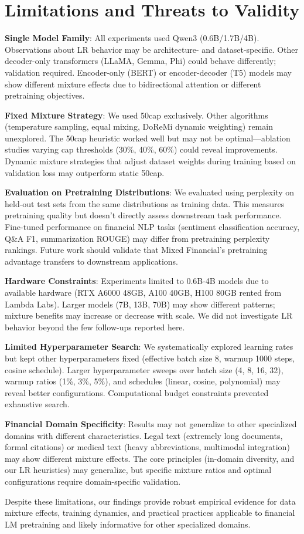 \section{Limitations and Threats to Validity}

\textbf{Single Model Family}: All experiments used Qwen3 (0.6B/1.7B/4B). Observations about LR behavior may be architecture- and dataset-specific. Other decoder-only transformers (LLaMA, Gemma, Phi) could behave differently; validation required. Encoder-only (BERT) or encoder-decoder (T5) models may show different mixture effects due to bidirectional attention or different pretraining objectives.

\textbf{Fixed Mixture Strategy}: We used 50cap exclusively. Other algorithms (temperature sampling, equal mixing, DoReMi dynamic weighting) remain unexplored. The 50cap heuristic worked well but may not be optimal—ablation studies varying cap thresholds (30\%, 40\%, 60\%) could reveal improvements. Dynamic mixture strategies that adjust dataset weights during training based on validation loss may outperform static 50cap.

\textbf{Evaluation on Pretraining Distributions}: We evaluated using perplexity on held-out test sets from the same distributions as training data. This measures pretraining quality but doesn't directly assess downstream task performance. Fine-tuned performance on financial NLP tasks (sentiment classification accuracy, Q\&A F1, summarization ROUGE) may differ from pretraining perplexity rankings. Future work should validate that Mixed Financial's pretraining advantage transfers to downstream applications.

\textbf{Hardware Constraints}: Experiments limited to 0.6B-4B models due to available hardware (RTX A6000 48GB, A100 40GB, H100 80GB rented from Lambda Labs). Larger models (7B, 13B, 70B) may show different patterns; mixture benefits may increase or decrease with scale. We did not investigate LR behavior beyond the few follow-ups reported here.

\textbf{Limited Hyperparameter Search}: We systematically explored learning rates but kept other hyperparameters fixed (effective batch size 8, warmup 1000 steps, cosine schedule). Larger hyperparameter sweeps over batch size (4, 8, 16, 32), warmup ratios (1\%, 3\%, 5\%), and schedules (linear, cosine, polynomial) may reveal better configurations. Computational budget constraints prevented exhaustive search.

\textbf{Financial Domain Specificity}: Results may not generalize to other specialized domains with different characteristics. Legal text (extremely long documents, formal citations) or medical text (heavy abbreviations, multimodal integration) may show different mixture effects. The core principles (in-domain diversity, and our LR heuristics) may generalize, but specific mixture ratios and optimal configurations require domain-specific validation.

Despite these limitations, our findings provide robust empirical evidence for data mixture effects, training dynamics, and practical practices applicable to financial LM pretraining and likely informative for other specialized domains.
